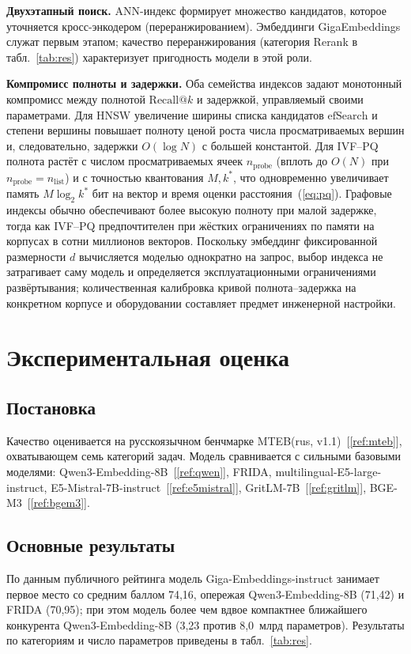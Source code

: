 \documentclass[12pt,a4paper]{article}
\begin{document}
\textbf{Двухэтапный поиск.} ANN-индекс формирует множество кандидатов, которое
уточняется кросс-энкодером (переранжированием). Эмбеддинги GigaEmbeddings служат
первым этапом; качество переранжирования (категория Rerank в табл.~\ref{tab:res})
характеризует пригодность модели в этой роли.

\textbf{Компромисс полноты и задержки.} Оба семейства индексов задают
монотонный компромисс между полнотой $\mathrm{Recall}@k$ и задержкой,
управляемый своими параметрами. Для HNSW увеличение ширины списка кандидатов
$\mathrm{efSearch}$ и степени вершины повышает полноту ценой роста числа
просматриваемых вершин и, следовательно, задержки $O(\log N)$ с большей
константой. Для IVF--PQ полнота растёт с числом просматриваемых ячеек
$n_{\text{probe}}$ (вплоть до $O(N)$ при $n_{\text{probe}} = n_{\text{list}}$) и
с точностью квантования $M, k^{*}$, что одновременно увеличивает память
$M\log_2 k^{*}$ бит на вектор и время оценки расстояния~(\ref{eq:pq}). Графовые
индексы обычно обеспечивают более высокую полноту при малой задержке, тогда как
IVF--PQ предпочтителен при жёстких ограничениях по памяти на корпусах в сотни
миллионов векторов. Поскольку эмбеддинг фиксированной размерности $d$
вычисляется моделью однократно на запрос, выбор индекса не затрагивает саму
модель и определяется эксплуатационными ограничениями развёртывания;
количественная калибровка кривой полнота--задержка на конкретном корпусе и
оборудовании составляет предмет инженерной настройки.

\section{Экспериментальная оценка}\label{sec:exp}
\subsection{Постановка}
Качество оценивается на русскоязычном бенчмарке MTEB(rus, v1.1)~[\ref{ref:mteb}],
охватывающем семь категорий задач. Модель сравнивается с сильными базовыми
моделями: Qwen3-Embedding-8B~[\ref{ref:qwen}], FRIDA, multilingual-E5-large-instruct,
E5-Mistral-7B-instruct~[\ref{ref:e5mistral}], GritLM-7B~[\ref{ref:gritlm}],
BGE-M3~[\ref{ref:bgem3}].

\subsection{Основные результаты}
По данным публичного рейтинга модель Giga-Embeddings-instruct занимает первое
место со средним баллом 74,16, опережая Qwen3-Embedding-8B (71,42) и FRIDA
(70,95); при этом модель более чем вдвое компактнее ближайшего конкурента
Qwen3-Embedding-8B (3,23 против 8,0~млрд параметров). Результаты по категориям и
число параметров приведены в табл.~\ref{tab:res}.
\end{document}
